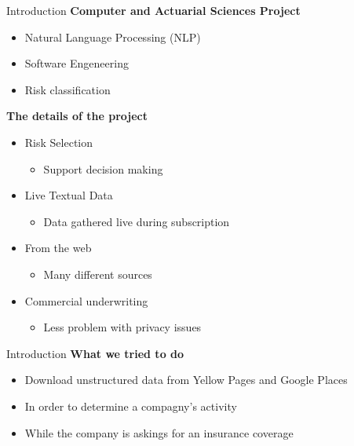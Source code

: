 

\begin{frame}[label=intro]{Introduction}
	\textbf{Computer and Actuarial Sciences Project}
	\begin{itemize}
		
		\item Natural Language Processing (NLP)
		\item Software Engeneering
		\item Risk classification
		
	\end{itemize}
	
	\textbf{The details of the project}
	\begin{itemize}
		\item Risk Selection
		\begin{itemize}
			\item Support decision making
		\end{itemize}			
		\item Live Textual Data
		\begin{itemize}
			\item Data gathered live during subscription
		\end{itemize}
		\item From the web
		\begin{itemize}
			\item Many different sources
		\end{itemize}
		\item Commercial underwriting
		\begin{itemize}
			\item Less problem with privacy issues
		\end{itemize}
	\end{itemize}
	
\end{frame}



\begin{frame}[label=intro]{Introduction}
	\textbf{What we tried to do}
	\begin{itemize}
		\item Download unstructured data from Yellow Pages and Google Places
		\item In order to determine a compagny's activity
		\item While the company is askings for an insurance coverage
	\end{itemize}
\end{frame}

